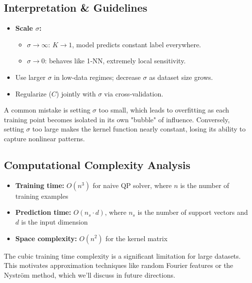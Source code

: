 \documentclass[11pt]{article}
\newenvironment{insight}
  {\begin{tcolorbox}[colback=blue!5!white,colframe=blue!75!black,title=Key Insight]}
  {\end{tcolorbox}}
\newenvironment{pitfall}
  {\begin{tcolorbox}[colback=red!5!white,colframe=red!75!black,title=Common Pitfall]}
  {\end{tcolorbox}}
\begin{document}
\subsection{Interpretation \& Guidelines}
\begin{itemize}
  \item \textbf{Scale $\sigma$:}  
    \begin{itemize}
      \item $\sigma\to\infty$: $K\to1$, model predicts constant label everywhere.  
      \item $\sigma\to0$: behaves like 1‐NN, extremely local sensitivity.
    \end{itemize}
  \item Use larger $\sigma$ in low‐data regimes; decrease $\sigma$ as dataset size grows.
  \item Regularize ($C$) jointly with $\sigma$ via cross‐validation.
\end{itemize}

\begin{pitfall}
A common mistake is setting $\sigma$ too small, which leads to overfitting as each training point becomes isolated in its own "bubble" of influence. Conversely, setting $\sigma$ too large makes the kernel function nearly constant, losing its ability to capture nonlinear patterns.
\end{pitfall}

\subsection{Computational Complexity Analysis}
\begin{itemize}
    \item \textbf{Training time:} $O(n^3)$ for naive QP solver, where $n$ is the number of training examples
    \item \textbf{Prediction time:} $O(n_s \cdot d)$, where $n_s$ is the number of support vectors and $d$ is the input dimension
    \item \textbf{Space complexity:} $O(n^2)$ for the kernel matrix
\end{itemize}

\begin{insight}
The cubic training time complexity is a significant limitation for large datasets. This motivates approximation techniques like random Fourier features or the Nyström method, which we'll discuss in future directions.
\end{insight}
\end{document}
